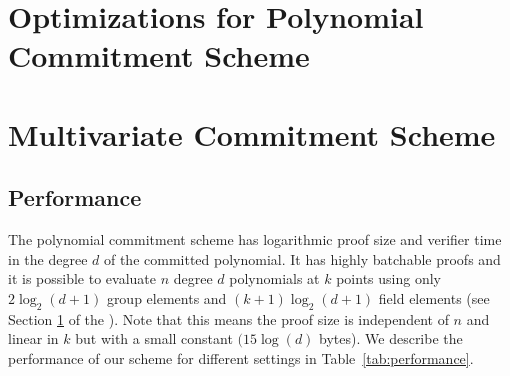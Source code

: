\section{Optimizations for Polynomial Commitment Scheme}
\label{subsec:optimization}

\section{Multivariate Commitment Scheme}
\label{sec:multivariate}



\subsection{Performance}
The polynomial commitment scheme has logarithmic proof size and verifier time in the degree $d$ of the committed polynomial. 
It has highly batchable proofs and it is possible to evaluate $n$ degree $d$ polynomials at $k$ points using only $2\log_2(d+1)$ group elements and $(k+1)\log_2(d+1)$ field elements (see Section \ref{subsec:optimization} of the \appendixphrase). Note that this means the proof size is independent of $n$ and linear in $k$ but with a small constant $(15 \log(d)$ bytes). 
We describe the performance of our scheme for different settings in Table~\ref{tab:performance}.

